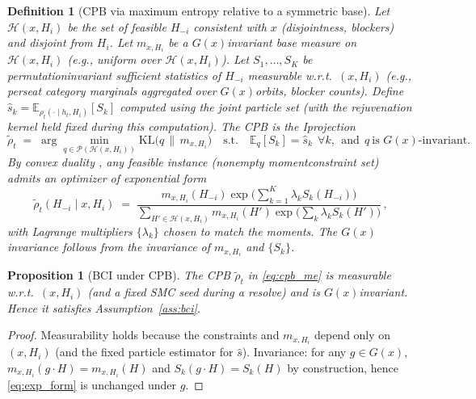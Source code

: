 \documentclass[10pt]{article}
\newcommand{\E}{\mathbb{E}}
\newcommand{\KL}{\mathrm{KL}}
\newcommand{\1}{\mathbf{1}}
\theoremstyle{plain}
\newtheorem{definition}{Definition}
\newtheorem{proposition}{Proposition}
\begin{document}
\begin{definition}[CPB via maximum entropy relative to a symmetric base]
\label{def:cpb}
Let $\mathcal{H}(x,H_i)$ be the set of feasible $H_{-i}$ consistent with $x$ (disjointness, blockers) and disjoint from $H_i$. Let $m_{x,H_i}$ be a $G(x)$\textendash invariant base measure on $\mathcal{H}(x,H_i)$ (e.g., uniform over $\mathcal{H}(x,H_i)$). Let $S_1,\dots,S_K$ be permutation\textendash invariant sufficient statistics of $H_{-i}$ measurable w.r.t.\ $(x,H_i)$ (e.g., per\textendash seat category marginals aggregated over $G(x)$\textendash orbits, blocker counts). Define $\widehat s_k=\E_{\rho_t(\cdot\mid h_t,H_i)}[S_k]$ computed using the joint particle set (with the rejuvenation kernel held fixed during this computation). The CPB is the I\textendash projection
\begin{equation}
\label{eq:cpb_me}
\tilde\rho_t \;=\; \arg\min_{q\in \mathcal{P}(\mathcal{H}(x,H_i))}\KL\!\big(q \,\|\, m_{x,H_i}\big)\quad 
\text{s.t.}\quad \E_q[S_k]=\widehat s_k \ \ \forall k,\ \ \text{and}\ \ q\ \text{is }G(x)\text{-invariant}.
\end{equation}
By convex duality \citep{csiszar1975i}, any feasible instance (nonempty moment\textendash constraint set) admits an optimizer of exponential form
\begin{equation}
\label{eq:exp_form}
\tilde\rho_t(H_{-i}\!\mid\!x,H_i) \;=\; \frac{m_{x,H_i}(H_{-i})\exp\!\Big(\sum_{k=1}^K \lambda_k S_k(H_{-i})\Big)}{\sum_{H' \in \mathcal{H}(x,H_i)} m_{x,H_i}(H')\exp\!\big(\sum_k \lambda_k S_k(H')\big)}\,,
\end{equation}
with Lagrange multipliers $\{\lambda_k\}$ chosen to match the moments. The $G(x)$\textendash invariance follows from the invariance of $m_{x,H_i}$ and $\{S_k\}$.
\end{definition}

\begin{proposition}[BCI under CPB]
\label{prop:bci}
The CPB $\tilde\rho_t$ in \eqref{eq:cpb_me} is measurable w.r.t.\ $(x,H_i)$ (and a fixed SMC seed during a re\textendash solve) and is $G(x)$\textendash invariant. Hence it satisfies Assumption~\ref{ass:bci}.
\end{proposition}
\begin{proof}
Measurability holds because the constraints and $m_{x,H_i}$ depend only on $(x,H_i)$ (and the fixed particle estimator for $\widehat s$). Invariance: for any $g\in G(x)$, $m_{x,H_i}(g\!\cdot\!H)=m_{x,H_i}(H)$ and $S_k(g\!\cdot\!H)=S_k(H)$ by construction, hence \eqref{eq:exp_form} is unchanged under $g$.
\end{proof}
\end{document}
